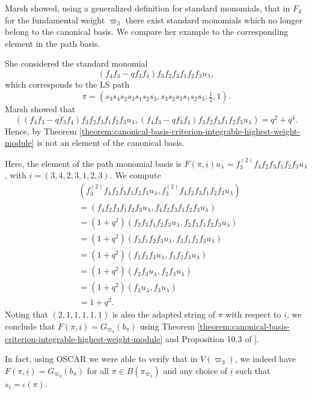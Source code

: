 \documentclass[final]{amsart}
\theoremstyle{plain}
\theoremstyle{definition}
\newcommand{\uli}{{\underline i}}
\begin{document}
Marsh \cite{Marsh:CanonicalBasis-StandardMonomials} showed, using a generalized definition for standard monomials, that in $F_4$ for the fundamental weight $\varpi_3$ there exist standard monomials which no longer belong to the canonical basis.
We compare her example to the corresponding element in the path basis.

She considered the standard monomial
\[
    (f_4f_3 - q f_3f_4)f_3f_2f_3f_1f_2f_3 u_\lambda,
\]
which corresponds to the LS path
\[
    \pi = (s_3s_4s_2s_3s_1s_2s_3, s_3s_2s_3s_1s_2s_3; \tfrac12, 1).
\]
Marsh showed that
\[
    ((f_4f_3 - q f_3f_4)f_3f_2f_3f_1f_2f_3 u_\lambda, (f_4f_3 - q f_3f_4)f_3f_2f_3f_1f_2f_3 u_\lambda) = q^2 + q^4.
\]
Hence, by Theorem \ref{theorem:canonical-basis-criterion-integrable-highest-weight-module} is not an element of the canonical basis.

Here, the element of the path monomial basis is $F(\pi, \uli) u_\lambda = f_3^{(2)} f_4 f_2 f_3 f_1 f_2 f_3 u_\lambda$, with $\uli = (3,4,2,3,1,2,3)$.
We compute
\begin{align*}
    & (f_3^{(2)}f_4f_2f_3f_1f_2f_3 u_\lambda, f_3^{(2)}f_4f_2f_3f_1f_2f_3 u_\lambda) \\
    &= (f_4f_2f_3f_1f_2f_3 u_\lambda, f_4f_2f_3f_1f_2f_3 u_\lambda) \\
    &= (1+q^2) (f_2f_3f_1f_2f_3 u_\lambda, f_2f_3f_1f_2f_3 u_\lambda) \\
    &= (1+q^2) (f_3f_1f_2f_3 u_\lambda, f_3f_1f_2f_3 u_\lambda) \\
    &= (1+q^2) (f_1f_2f_3 u_\lambda, f_1f_2f_3 u_\lambda) \\
    &= (1+q^2) (f_2f_3 u_\lambda, f_2f_3 u_\lambda) \\
    &= (1+q^2) (f_3 u_\lambda, f_3 u_\lambda) \\
    &= 1 + q^2.
\end{align*}
Noting that $(2,1,1,1,1,1)$ is also the adapted string of $\pi$ with respect to $\uli$, we conclude that $F(\pi, \uli) = G_{\varpi_3}(b_\pi)$ using Theorem \ref{theorem:canonical-basis-criterion-integrable-highest-weight-module} and Proposition 10.3 of \cite{Littelmann:Cones-Crystals-Patterns}].

In fact, using OSCAR \cite{OSCAR} we were able to verify that in $V(\varpi_3)$, we indeed have $F(\pi, \uli) = G_{\varpi_3}(b_\pi)$ for all $\pi \in B(\pi_{\varpi_3})$ and any choice of $\uli$ such that $s_\uli = \iota(\pi)$.
\end{document}
